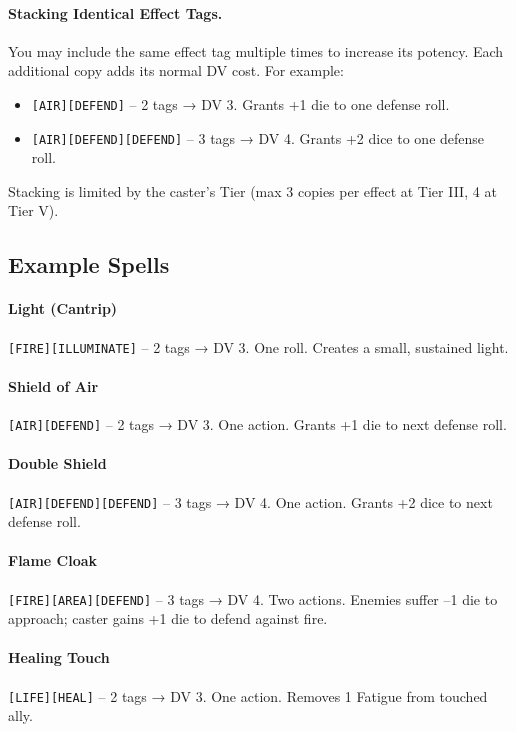 \paragraph{Stacking Identical Effect Tags.}
You may include the same effect tag multiple times to increase its potency. Each additional copy adds its normal DV cost. For example:
\begin{itemize}
  \item \texttt{[AIR][DEFEND]} – 2 tags → DV 3. Grants +1 die to one defense roll.
  \item \texttt{[AIR][DEFEND][DEFEND]} – 3 tags → DV 4. Grants +2 dice to one defense roll.
\end{itemize}
Stacking is limited by the caster's Tier (max 3 copies per effect at Tier III, 4 at Tier V).

\subsection{Example Spells}

\paragraph{Light (Cantrip)} \texttt{[FIRE][ILLUMINATE]} – 2 tags → DV 3. One roll. Creates a small, sustained light.

\paragraph{Shield of Air} \texttt{[AIR][DEFEND]} – 2 tags → DV 3. One action. Grants +1 die to next defense roll.

\paragraph{Double Shield} \texttt{[AIR][DEFEND][DEFEND]} – 3 tags → DV 4. One action. Grants +2 dice to next defense roll.

\paragraph{Flame Cloak} \texttt{[FIRE][AREA][DEFEND]} – 3 tags → DV 4. Two actions. Enemies suffer –1 die to approach; caster gains +1 die to defend against fire.

\paragraph{Healing Touch} \texttt{[LIFE][HEAL]} – 2 tags → DV 3. One action. Removes 1 Fatigue from touched ally.

